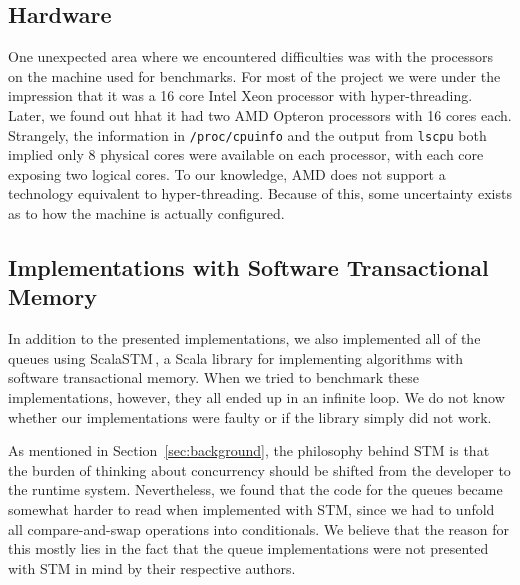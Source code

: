 \subsection{Hardware}
\label{sub:hardware}
One unexpected area where we encountered difficulties was with the processors
on the machine used for benchmarks. For most of the project we were under the
impression that it was a 16 core Intel Xeon processor with hyper-threading.
Later, we found out hhat it had two AMD Opteron processors with 16 cores each.
Strangely, the information in \texttt{/proc/cpuinfo} and the output from
\texttt{lscpu} both implied only 8 physical cores were available on each
processor, with each core exposing two logical cores. To our knowledge, AMD
does not support a technology equivalent to hyper-threading. Because of this,
some uncertainty exists as to how the machine is actually configured.

\subsection{Implementations with Software Transactional Memory}
\label{sub:stm_queues}
In addition to the presented implementations, we also implemented all of the queues using ScalaSTM\,\citep{ScalaSTM}, a Scala library for implementing algorithms with software transactional memory. When we tried to benchmark these implementations, however, they all ended up in an infinite loop. We do not know whether our implementations were faulty or if the library simply did not work.

As mentioned in Section~\ref{sec:background}, the philosophy behind STM is that the burden of thinking about concurrency should be shifted from the developer to the runtime system. Nevertheless, we found that the code for the queues became somewhat harder to read when implemented with STM, since we had to unfold all compare-and-swap operations into conditionals. We believe that the reason for this mostly lies in the fact that the queue implementations were not presented with STM in mind by their respective authors.
